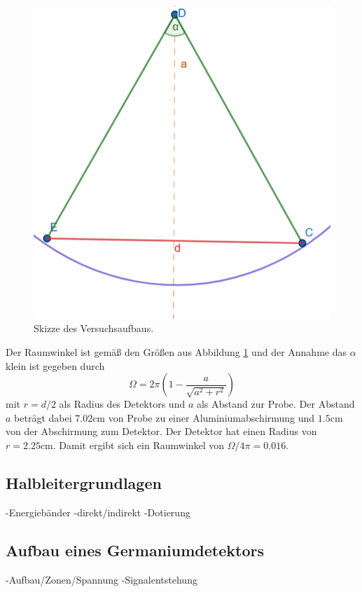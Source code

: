\begin{figure}[H]
    \centering
    \includegraphics[scale=0.6]{illustration/Raumwinkel.png}
    \caption{Skizze des Versuchsaufbaus.}
    \label{fig:Raumwinkel}
\end{figure}
\noindent Der Raumwinkel ist gemäß den Größen aus Abbildung \ref{fig:Raumwinkel} und der Annahme das $\alpha$ klein ist gegeben durch
\begin{equation}
    \label{eq:Raumwinkel}
    \Omega = 2\pi\left(1-\frac{a}{\sqrt{a^2+r^2}}\right)
\end{equation}
mit $r=d/2$ als Radius des Detektors und $a$ als Abstand zur Probe. Der Abstand $a$ beträgt dabei $7.02\si{\centi\meter}$ von Probe zu einer Aluminiumabschirmung
und $1.5\si{\centi\meter}$ von der Abschirmung zum Detektor. Der Detektor hat einen Radius von $r=2.25\si{\centi\meter}$.
Damit ergibt sich ein Raumwinkel von $\Omega/4\pi=0.016$.
\subsection{Halbleitergrundlagen}
-Energiebänder
-direkt/indirekt
-Dotierung
\subsection{Aufbau eines Germaniumdetektors}
-Aufbau/Zonen/Spannung
-Signalentstehung

